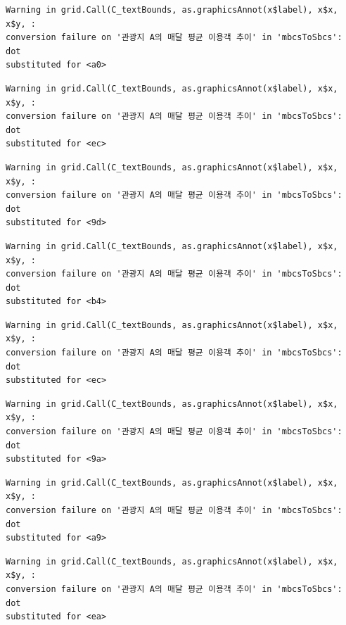 \documentclass[
  letterpaper,
  DIV=11,
  numbers=noendperiod]{scrreprt}
\begin{document}
\begin{verbatim}
Warning in grid.Call(C_textBounds, as.graphicsAnnot(x$label), x$x, x$y, :
conversion failure on '관광지 A의 매달 평균 이용객 추이' in 'mbcsToSbcs': dot
substituted for <a0>
\end{verbatim}

\begin{verbatim}
Warning in grid.Call(C_textBounds, as.graphicsAnnot(x$label), x$x, x$y, :
conversion failure on '관광지 A의 매달 평균 이용객 추이' in 'mbcsToSbcs': dot
substituted for <ec>
\end{verbatim}

\begin{verbatim}
Warning in grid.Call(C_textBounds, as.graphicsAnnot(x$label), x$x, x$y, :
conversion failure on '관광지 A의 매달 평균 이용객 추이' in 'mbcsToSbcs': dot
substituted for <9d>
\end{verbatim}

\begin{verbatim}
Warning in grid.Call(C_textBounds, as.graphicsAnnot(x$label), x$x, x$y, :
conversion failure on '관광지 A의 매달 평균 이용객 추이' in 'mbcsToSbcs': dot
substituted for <b4>
\end{verbatim}

\begin{verbatim}
Warning in grid.Call(C_textBounds, as.graphicsAnnot(x$label), x$x, x$y, :
conversion failure on '관광지 A의 매달 평균 이용객 추이' in 'mbcsToSbcs': dot
substituted for <ec>
\end{verbatim}

\begin{verbatim}
Warning in grid.Call(C_textBounds, as.graphicsAnnot(x$label), x$x, x$y, :
conversion failure on '관광지 A의 매달 평균 이용객 추이' in 'mbcsToSbcs': dot
substituted for <9a>
\end{verbatim}

\begin{verbatim}
Warning in grid.Call(C_textBounds, as.graphicsAnnot(x$label), x$x, x$y, :
conversion failure on '관광지 A의 매달 평균 이용객 추이' in 'mbcsToSbcs': dot
substituted for <a9>
\end{verbatim}

\begin{verbatim}
Warning in grid.Call(C_textBounds, as.graphicsAnnot(x$label), x$x, x$y, :
conversion failure on '관광지 A의 매달 평균 이용객 추이' in 'mbcsToSbcs': dot
substituted for <ea>
\end{verbatim}
\end{document}
